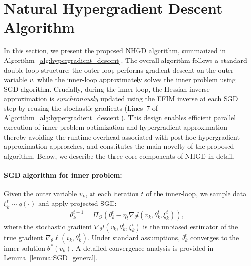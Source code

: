 \documentclass[11 pt]{article}
\begin{document}
\section{Natural Hypergradient Descent Algorithm}\label{sec:algo_design}

In this section, we present the proposed NHGD algorithm, summarized in Algorithm~\ref{alg:hypergradient_descent}. 
The overall algorithm follows a standard double-loop structure: the outer-loop performs gradient descent on the outer variable $v$, while the inner-loop approximately solves the inner problem using SGD algorithm. 
Crucially, during the inner-loop, the Hessian inverse approximation is \emph{synchronously} updated using the EFIM inverse
at each SGD step by reusing the stochastic gradients (Lines~7 of Algorithm~\ref{alg:hypergradient_descent}). 
This design enables efficient parallel execution of inner problem optimization and hypergradient approximation, thereby avoiding the runtime overhead associated with post hoc hypergradient approximation approaches, and constitutes the main novelty of the proposed algorithm. Below, we describe the three core components of NHGD in detail.

\paragraph{SGD algorithm for inner problem:}
Given the outer variable $v_k$, at each iteration $t$ of the inner-loop, we sample data $\xi_k^t \sim q(\cdot)$ and apply projected SGD: 
\begin{align}\label{eq:proj_sgd}
    \theta_{k}^{t+1} = \Pi_{\Theta} \left(\theta_k^t - \eta_t \nabla_\theta l (v_k,\theta_k^t,\xi_k^t)\right),
\end{align}
where the stochastic gradient $\nabla_\theta l(v_k,\theta_k^t,\xi_k^t)$ is the unbiased estimator of the true gradient $\nabla_\theta \ell(v_k,\theta_k^t)$. Under standard assumptions, $\theta_k^t$ converges to the inner solution $\theta^*(v_k)$. A detailed convergence analysis is provided in Lemma~\ref{lemma:SGD_general}.
\end{document}
